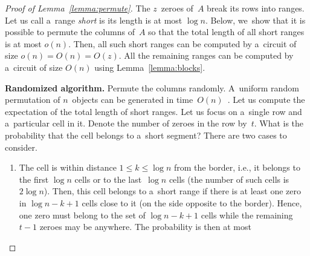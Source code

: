 \begin{proof}[Proof of Lemma~\ref{lemma:permute}]
The $z$~zeroes of~$A$ break its rows into ranges.
Let us call a~range {\em short} is its length is at most $\log n$.
Below, we~show that it is possible to permute the columns of~$A$
so that the total length of all short ranges is at most $o(n)$.
Then, all such short ranges can be computed by a~circuit of size
$o(n)=O(n)=O(z)$. All the remaining ranges can be
computed by a~circuit of size $O(n)$ using Lemma~\ref{lemma:blocks}.


\textbf{Randomized algorithm.}
Permute the columns randomly. A~uniform random permutation
of $n$~objects can be generated in
time~$O(n)$~\cite[Algorithm~P (Shuffling)]{DBLP:books/lib/Knuth98}.
Let us compute the expectation of
the total length of short ranges.
Let us focus on a~single row and a~particular cell in it. Denote the number of
zeroes in the row by~$t$. What is the probability that the cell belongs to
a~short segment? There are two cases to consider.


\begin{enumerate}
\item The cell is within distance $1 \le k \le \log n$ from the border, i.e.,
it belongs to the first $\log n$ cells or to the last~$\log n$ cells
(the number of such cells is $2\log n$). Then,
this cell belongs to a~short range if there is at least one zero
in $\log n - k + 1$ cells close to it (on the side opposite to the border).
Hence, one zero must belong to the set of $\log n - k + 1$ cells while the
remaining $t-1$ zeroes may be anywhere. The probability is then at most


\end{enumerate}
\end{proof}
